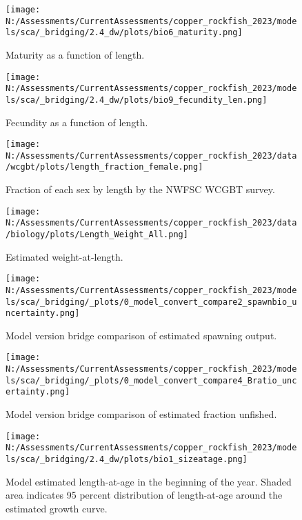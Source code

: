 \documentclass[11pt,
  english,
  letterpaper,
]{article}
\begin{document}
\begin{figure}
\centering
\texttt{[image: N:/Assessments/CurrentAssessments/copper\_rockfish\_2023/models/sca/\_bridging/2.4\_dw/plots/bio6\_maturity.png]}
\caption{Maturity as a function of length.\label{fig:maturity}}
\end{figure}

\begin{figure}
\centering
\texttt{[image: N:/Assessments/CurrentAssessments/copper\_rockfish\_2023/models/sca/\_bridging/2.4\_dw/plots/bio9\_fecundity\_len.png]}
\caption{Fecundity as a function of length.\label{fig:fecundity}}
\end{figure}

\begin{figure}
\centering
\texttt{[image: N:/Assessments/CurrentAssessments/copper\_rockfish\_2023/data/wcgbt/plots/length\_fraction\_female.png]}
\caption{Fraction of each sex by length by the NWFSC WCGBT survey.\label{fig:frac-sex-len}}
\end{figure}

\begin{figure}
\centering
\texttt{[image: N:/Assessments/CurrentAssessments/copper\_rockfish\_2023/data/biology/plots/Length\_Weight\_All.png]}
\caption{Estimated weight-at-length.\label{fig:weight-length}}
\end{figure}

\begin{figure}
\centering
\texttt{[image: N:/Assessments/CurrentAssessments/copper\_rockfish\_2023/models/sca/\_bridging/\_plots/0\_model\_convert\_compare2\_spawnbio\_uncertainty.png]}
\caption{Model version bridge comparison of estimated spawning output.\label{fig:bridge-ssb}}
\end{figure}

\begin{figure}
\centering
\texttt{[image: N:/Assessments/CurrentAssessments/copper\_rockfish\_2023/models/sca/\_bridging/\_plots/0\_model\_convert\_compare4\_Bratio\_uncertainty.png]}
\caption{Model version bridge comparison of estimated fraction unfished.\label{fig:bridge-depl}}
\end{figure}

\begin{figure}
\centering
\texttt{[image: N:/Assessments/CurrentAssessments/copper\_rockfish\_2023/models/sca/\_bridging/2.4\_dw/plots/bio1\_sizeatage.png]}
\caption{Model estimated length-at-age in the beginning of the year. Shaded area indicates 95 percent distribution of length-at-age around the estimated growth curve.\label{fig:mod-est-len-age}}
\end{figure}
\end{document}
